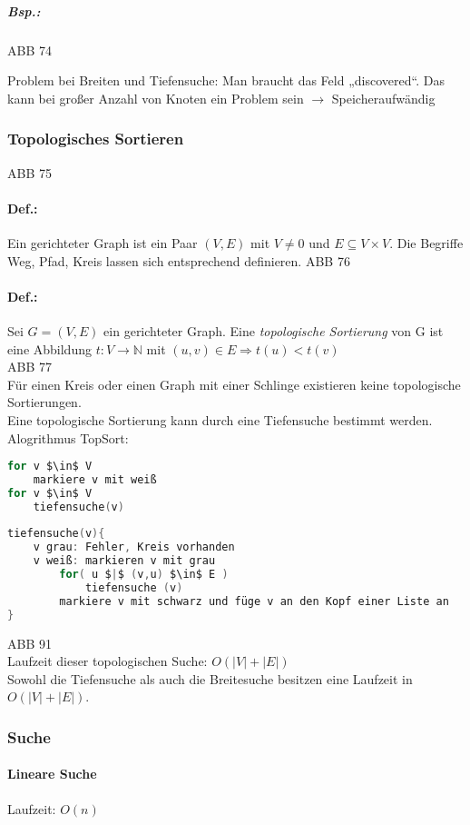 \subparagraph{Bsp.:} \parskp
ABB 74 \bigskip

Problem bei Breiten und Tiefensuche: Man braucht das Feld „discovered“. Das kann bei großer Anzahl von Knoten ein Problem sein $\rightarrow$ Speicheraufwändig

\subsubsection{Topologisches Sortieren} \parskp
ABB 75
\paragraph{Def.:} Ein gerichteter Graph ist ein Paar $(V,E)$ mit $V\not = 0$ und $E \subseteq V \times V$. Die Begriffe Weg, Pfad, Kreis lassen sich entsprechend definieren.
ABB 76

\paragraph{Def.:} Sei $G=(V,E)$ ein gerichteter Graph. Eine \emph{topologische Sortierung} von G ist eine Abbildung $t: V\rightarrow \mathbb{N} $ mit $ (u,v) \in E \Rightarrow t(u) < t(v)$\\
ABB 77\\
Für einen Kreis oder einen Graph mit einer Schlinge existieren keine topologische Sortierungen.\medskip\\
Eine topologische Sortierung kann durch eine Tiefensuche bestimmt werden.\\
Alogrithmus TopSort:
\begin{lstlisting}[language=C]
for v $\in$ V
	markiere v mit weiß
for v $\in$ V
	tiefensuche(v)
	
tiefensuche(v){
	v grau: Fehler, Kreis vorhanden
	v weiß: markieren v mit grau
		for( u $|$ (v,u) $\in$ E )
			tiefensuche (v)
		markiere v mit schwarz und füge v an den Kopf einer Liste an
}
\end{lstlisting}
ABB 91\\
Laufzeit dieser topologischen Suche: $O(|V|+|E|)$\\
Sowohl die Tiefensuche als auch die Breitesuche besitzen eine Laufzeit in $O(|V|+|E|)$.

\subsubsection{Suche}
\paragraph{Lineare Suche} Laufzeit: $O(n)$
